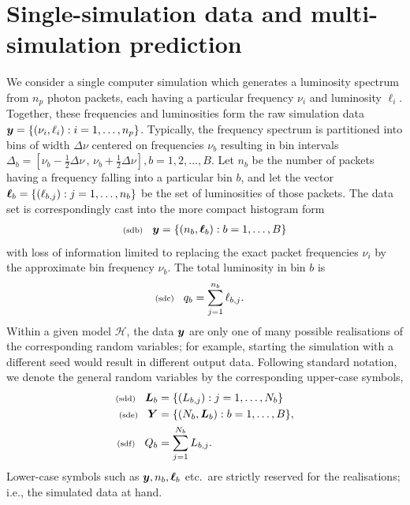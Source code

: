 \documentclass[11pt]{article}
\newcommand{\lleq}[1]{\label{#1} }
\renewcommand{\lleq}[1]{\label{#1} {\scriptstyle {\rm (#1)}} \hspace*{2ex} }
\newcommand{\hypo}  {{\mathcal{H}}}  %
\newcommand{\npack}{{n_p}}
\newcommand{\Lumtot}{Q}
\newcommand{\lumtot}{q}
\newcommand{\Lum}{L}
\newcommand{\lum}{\ell}
\begin{document}
\section{Single-simulation data and multi-simulation prediction}


We consider a single computer simulation which generates a luminosity
spectrum from $\npack$ photon packets, each having a particular
frequency $\nu_i$ and luminosity $\lum_i$. Together, these frequencies
and luminosities form the raw simulation data
$\bmy = \{ (\nu_i,\lum_i): i = 1,\ldots,\npack\}$. Typically, the
frequency spectrum is partitioned into bins of width $\Delta\nu$
centered on frequencies $\nu_b$ resulting in bin intervals
$\Delta_b = [\nu_b {-} \tfrac{1}{2} \Delta\nu \,,\, \nu_b {+}
\tfrac{1}{2} \Delta\nu], b = 1,2,\ldots, B$.  Let $n_b$ be the number
of packets having a frequency falling into a particular bin $b$, and
let the vector ${\bm{\ell}}_b = \{(\ell_{b,j}): j = 1,\ldots,n_b\}$ be the
set of luminosities of those packets. The data set is correspondingly
cast into the more compact histogram form
\begin{align}
  \lleq{sdb}
  \bmy = \{(n_b,\bml_b): b = 1,\ldots,B\}
\end{align}
with loss of information limited to replacing the exact packet
frequencies $\nu_i$ by the approximate bin frequency $\nu_b$. The
total luminosity in bin $b$ is
\begin{align}
  \lleq{sdc}
  \lumtot_b
  &= \sum_{j=1}^{n_b} \lum_{b,j}.
\end{align}
Within a given model $\hypo$, the data ${\bm{y}}$ are only one of many
possible realisations of the corresponding random variables; for
example, starting the simulation with a different seed would result in
different output data. Following standard notation, we denote the
general random variables by the corresponding upper-case symbols,
\begin{align}
  \lleq{sdd}
  \bmL_b &= \{(\Lum_{b,j}): j = 1,\ldots,N_b\}\\
  \lleq{sde}
  \bmY &= \{(N_b, \bmL_b): b = 1,\ldots,B\},\\
  \lleq{sdf}
  \Lumtot_b &= \sum_{j=1}^{N_b} \Lum_{b,j}.
\end{align}
Lower-case symbols such as ${\bm{y}}, n_b,{\bm{\ell}}_b$ etc.\ are strictly
reserved for the realisations; i.e., the simulated data at hand.
\end{document}
